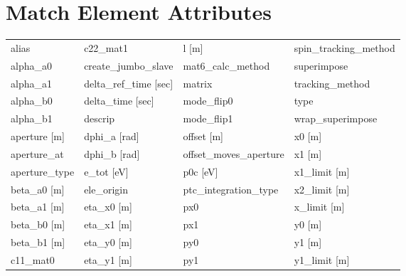  \section{Match Element Attributes}
 \label{s:list.match}
 
 \begin{tabular}{llll} \toprule
alias                            & c22_mat1                         & l [m]                            & spin_tracking_method             \\
alpha_a0                         & create_jumbo_slave               & mat6_calc_method                 & superimpose                      \\
alpha_a1                         & delta_ref_time [sec]             & matrix                           & tracking_method                  \\
alpha_b0                         & delta_time [sec]                 & mode_flip0                       & type                             \\
alpha_b1                         & descrip                          & mode_flip1                       & wrap_superimpose                 \\
aperture [m]                     & dphi_a [rad]                     & offset [m]                       & x0 [m]                           \\
aperture_at                      & dphi_b [rad]                     & offset_moves_aperture            & x1 [m]                           \\
aperture_type                    & e_tot [eV]                       & p0c [eV]                         & x1_limit [m]                     \\
beta_a0 [m]                      & ele_origin                       & ptc_integration_type             & x2_limit [m]                     \\
beta_a1 [m]                      & eta_x0 [m]                       & px0                              & x_limit [m]                      \\
beta_b0 [m]                      & eta_x1 [m]                       & px1                              & y0 [m]                           \\
beta_b1 [m]                      & eta_y0 [m]                       & py0                              & y1 [m]                           \\
c11_mat0                         & eta_y1 [m]                       & py1                              & y1_limit [m]                     \\

\end{tabular}
